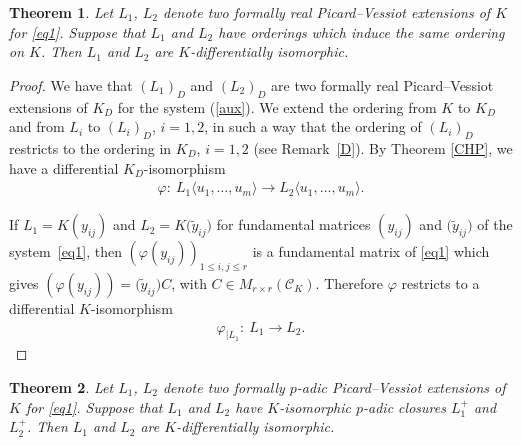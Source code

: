 \documentclass[pdftex]{sigma}%
\numberwithin{equation}{section}
\newtheorem{Theorem}{Theorem}[section]
\begin{document}
\begin{Theorem}\label{realuni} Let $L_1$, $L_2$ denote two formally real Picard--Vessiot extensions of $K$ for \eqref{eq1}. Suppose that $L_1$ and $L_2$ have orderings which induce the same ordering on $K$. Then $L_1$ and $L_2$ are $K$-differentially isomorphic.
\end{Theorem}

\begin{proof}
 We have that $(L_1)_D$ and $(L_2)_D$ are two formally real Picard--Vessiot extensions of $K_D$ for the system (\ref{aux}). We extend the ordering from $K$ to $K_D$ and from $L_i$ to $(L_i)_D$, $i=1,2$, in such a way that the ordering of $(L_i)_D$ restricts to the ordering in $K_D$, $i=1,2$ (see Remark~\ref{D}). By Theorem \ref{CHP}, we have a differential $K_D$-isomorphism
\begin{gather*}
\varphi\colon\ L_1\langle u_1,\dots,u_m \rangle \rightarrow L_2\langle u_1,\dots,u_m \rangle.
\end{gather*}

If $L_1=K(y_{ij})$ and $L_2=K\big(\widetilde{y}_{ij}\big)$ for fundamental matrices $(y_{ij})$ and $\big(\widetilde{y}_{ij}\big)$ of the system~\eqref{eq1}, then $(\varphi(y_{ij}))_{1\leq i,j\leq r}$ is a fundamental matrix of \eqref{eq1} which gives $(\varphi(y_{ij}))=\big(\widetilde{y}_{ij}\big) C$, with $C \in M_{r\times r} (\mathcal{C}_K)$. Therefore $\varphi$ restricts to a differential $K$-isomorphism
\begin{gather*}
\varphi_{|L_1}\colon\ L_1 \rightarrow L_2. \tag*{\qed}
\end{gather*}
\renewcommand{\qed}{}
\end{proof}


\begin{Theorem} Let $L_1$, $L_2$ denote two formally $p$-adic Picard--Vessiot extensions of $K$ for \eqref{eq1}. Suppose that $L_1$ and $L_2$
have $K$-isomorphic $p$-adic closures $L_1^+$ and $L_2^+$. Then $L_1$ and $L_2$ are $K$-differentially isomorphic.
\end{Theorem}
\end{document}
